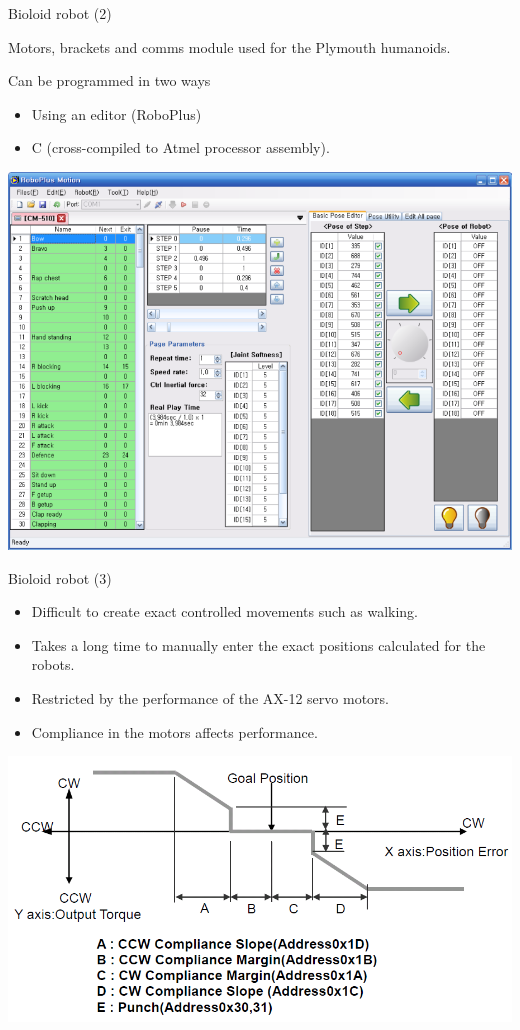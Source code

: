 \documentclass[compress]{beamer}
\begin{document}
\begin{frame}{Bioloid robot (2)}

    Motors, brackets and comms module used for the Plymouth humanoids.

    Can be programmed in two ways

    \begin{itemize}

        \item Using an editor (RoboPlus)
        \item C (cross-compiled to Atmel processor assembly).
    \end{itemize}

    \begin{center}
        \includegraphics[width=0.8\linewidth]{image25}
    \end{center}
\end{frame}

\begin{frame}{Bioloid robot (3)}

    \begin{itemize}

        \item Difficult to create exact controlled movements such as walking.
        \item Takes a long time to manually enter the exact positions calculated for
            the robots.
        \item Restricted by the performance of the AX-12 servo motors.
        \item Compliance in the motors affects performance.
    \end{itemize}

    \begin{center}
        \includegraphics[width=0.8\linewidth]{image26}
    \end{center}
\end{frame}
\end{document}

